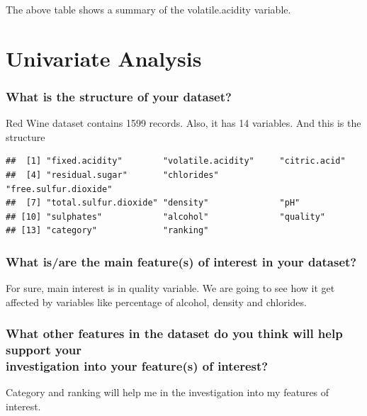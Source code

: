 \documentclass[]{article}
\begin{document}
The above table shows a summary of the volatile.acidity variable.

\section{Univariate Analysis}\label{univariate-analysis}

\subsubsection{What is the structure of your
dataset?}\label{what-is-the-structure-of-your-dataset}

Red Wine dataset contains 1599 records. Also, it has 14 variables. And
this is the structure

\begin{verbatim}
##  [1] "fixed.acidity"        "volatile.acidity"     "citric.acid"         
##  [4] "residual.sugar"       "chlorides"            "free.sulfur.dioxide" 
##  [7] "total.sulfur.dioxide" "density"              "pH"                  
## [10] "sulphates"            "alcohol"              "quality"             
## [13] "category"             "ranking"
\end{verbatim}

\subsubsection{What is/are the main feature(s) of interest in your
dataset?}\label{what-isare-the-main-features-of-interest-in-your-dataset}

For sure, main interest is in quality variable. We are going to see how
it get affected by variables like percentage of alcohol, density and
chlorides.

\subsubsection{\texorpdfstring{What other features in the dataset do you
think will help support your\\
investigation into your feature(s) of
interest?}{What other features in the dataset do you think will help support your investigation into your feature(s) of interest?}}\label{what-other-features-in-the-dataset-do-you-think-will-help-support-your-investigation-into-your-features-of-interest}

Category and ranking will help me in the investigation into my features
of interest.
\end{document}

